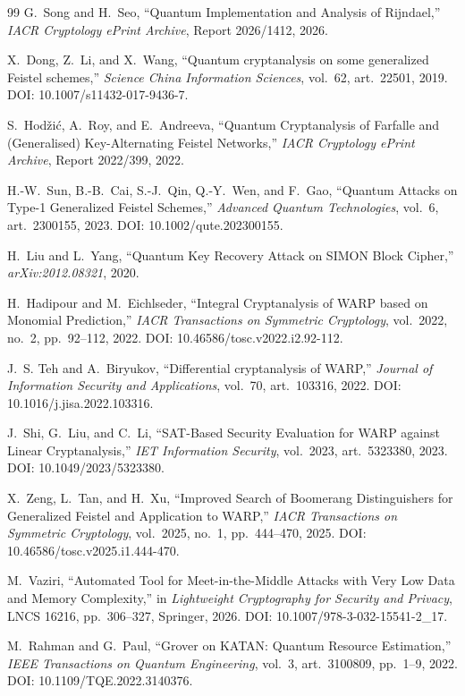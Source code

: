 \documentclass[pdflatex,sn-nature]{sn-jnl}
\theoremstyle{thmstyleone}
\theoremstyle{thmstyletwo}
\begin{document}
\begin{thebibliography}{99}
G.~Song and H.~Seo,
``Quantum Implementation and Analysis of Rijndael,''
\emph{IACR Cryptology ePrint Archive}, Report 2026/1412, 2026.

X.~Dong, Z.~Li, and X.~Wang,
``Quantum cryptanalysis on some generalized Feistel schemes,''
\emph{Science China Information Sciences}, vol.~62, art.~22501, 2019.
DOI: 10.1007/s11432-017-9436-7.

S.~Hod\v{z}i\'c, A.~Roy, and E.~Andreeva,
``Quantum Cryptanalysis of Farfalle and (Generalised) Key-Alternating Feistel Networks,''
\emph{IACR Cryptology ePrint Archive}, Report 2022/399, 2022.

H.-W.~Sun, B.-B.~Cai, S.-J.~Qin, Q.-Y.~Wen, and F.~Gao,
``Quantum Attacks on Type-1 Generalized Feistel Schemes,''
\emph{Advanced Quantum Technologies}, vol.~6, art.~2300155, 2023.
DOI: 10.1002/qute.202300155.

H.~Liu and L.~Yang,
``Quantum Key Recovery Attack on SIMON Block Cipher,''
\emph{arXiv:2012.08321}, 2020.


H.~Hadipour and M.~Eichlseder,
``Integral Cryptanalysis of WARP based on Monomial Prediction,''
\emph{IACR Transactions on Symmetric Cryptology}, vol.~2022, no.~2, pp.~92--112, 2022.
DOI: 10.46586/tosc.v2022.i2.92-112.

J.~S. Teh and A.~Biryukov,
``Differential cryptanalysis of WARP,''
\emph{Journal of Information Security and Applications}, vol.~70, art.~103316, 2022.
DOI: 10.1016/j.jisa.2022.103316.

J.~Shi, G.~Liu, and C.~Li,
``SAT-Based Security Evaluation for WARP against Linear Cryptanalysis,''
\emph{IET Information Security}, vol.~2023, art.~5323380, 2023.
DOI: 10.1049/2023/5323380.

X.~Zeng, L.~Tan, and H.~Xu,
``Improved Search of Boomerang Distinguishers for Generalized Feistel and Application to WARP,''
\emph{IACR Transactions on Symmetric Cryptology}, vol.~2025, no.~1, pp.~444--470, 2025.
DOI: 10.46586/tosc.v2025.i1.444-470.

M.~Vaziri,
``Automated Tool for Meet-in-the-Middle Attacks with Very Low Data and Memory Complexity,''
in \emph{Lightweight Cryptography for Security and Privacy}, LNCS 16216, pp.~306--327, Springer, 2026.
DOI: 10.1007/978-3-032-15541-2\_17.

M.~Rahman and G.~Paul,
``Grover on KATAN: Quantum Resource Estimation,''
\emph{IEEE Transactions on Quantum Engineering}, vol.~3, art.~3100809, pp.~1--9, 2022.
DOI: 10.1109/TQE.2022.3140376.


\end{thebibliography}
\end{document}
